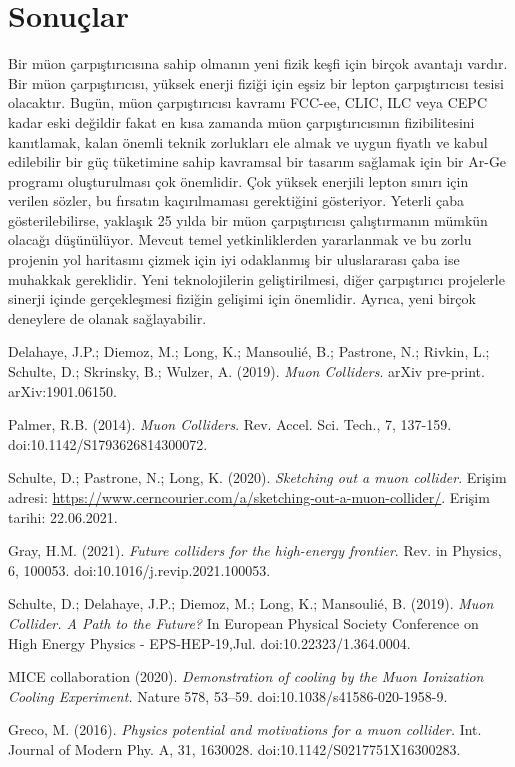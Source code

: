 \documentclass{article}
\begin{document}
\section{Sonuçlar}

Bir müon çarpıştırıcısına sahip olmanın yeni fizik keşfi için birçok avantajı vardır. Bir müon çarpıştırıcısı, yüksek enerji fiziği için eşsiz bir lepton çarpıştırıcısı tesisi olacaktır. Bugün, müon çarpıştırıcısı kavramı FCC-ee, CLIC, ILC veya CEPC kadar eski değildir fakat en kısa zamanda müon çarpıştırıcısının fizibilitesini kanıtlamak, kalan önemli teknik zorlukları ele almak ve uygun fiyatlı ve kabul edilebilir bir güç tüketimine sahip kavramsal bir tasarım sağlamak için bir Ar-Ge programı oluşturulması çok önemlidir. Çok yüksek enerjili lepton sınırı için verilen sözler, bu fırsatın kaçırılmaması gerektiğini gösteriyor. Yeterli çaba gösterilebilirse, yaklaşık 25 yılda bir müon çarpıştırıcısı çalıştırmanın mümkün olacağı düşünülüyor. Mevcut temel yetkinliklerden yararlanmak ve bu zorlu projenin yol haritasını çizmek için iyi odaklanmış bir uluslararası çaba ise muhakkak gereklidir. Yeni teknolojilerin geliştirilmesi, diğer çarpıştırıcı projelerle sinerji içinde gerçekleşmesi fiziğin gelişimi için önemlidir. Ayrıca, yeni birçok deneylere de olanak sağlayabilir.



	\begin{thebibliography}{99}
	
	 Delahaye, J.P.; Diemoz, M.; Long, K.; Mansouli\'e, B.; Pastrone, N.; Rivkin, L.; Schulte, D.; Skrinsky, B.; Wulzer, A. (2019). \textit{Muon Colliders}. arXiv pre-print. arXiv:1901.06150.
	
	 Palmer, R.B. (2014). \textit{Muon Colliders}. Rev. Accel. Sci. Tech., 7, 137-159. doi:10.1142/S1793626814300072.
	
	 Schulte, D.; Pastrone, N.; Long, K. (2020). \textit{Sketching out a muon collider}. Erişim adresi: \url{https://www.cerncourier.com/a/sketching-out-a-muon-collider/}. Erişim tarihi: 22.06.2021.
	
	 Gray, H.M. (2021). \textit{Future colliders for the high-energy frontier}. Rev. in Physics, 6, 100053. doi:10.1016/j.revip.2021.100053.
	
	 Schulte, D.; Delahaye, J.P.; Diemoz, M.; Long, K.; Mansouli\'e, B. (2019). \textit{Muon Collider. A Path to the Future?} In European Physical Society Conference on High Energy Physics - EPS-HEP-19,Jul. doi:10.22323/1.364.0004.
	
	 MICE collaboration (2020). \textit{Demonstration of cooling by the Muon Ionization Cooling Experiment.} Nature 578, 53–59. doi:10.1038/s41586-020-1958-9.
	
	 Greco, M. (2016). \textit{Physics potential and motivations for a muon collider.} Int. Journal of Modern Phy. A, 31, 1630028. doi:10.1142/S0217751X16300283.


	\end{thebibliography}
	
\end{document}
